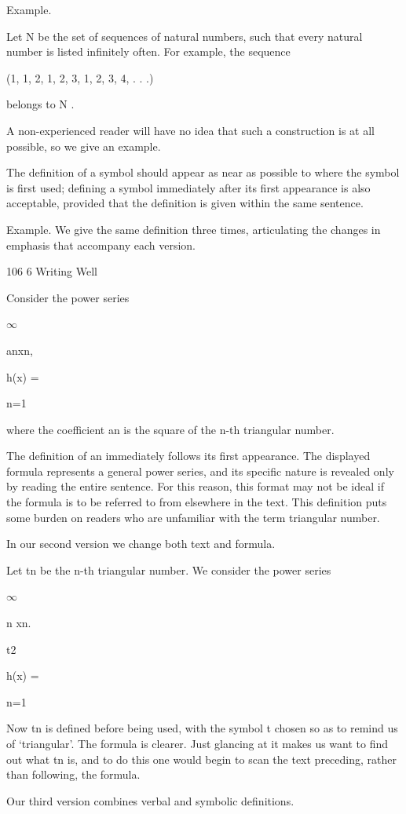 \documentclass[11pt]{article}
\theoremstyle{plain}
\theoremstyle{definition}
\begin{document}
Example.

Let N be the set of sequences of natural numbers, such that every natural number is listed infinitely often. For example, the sequence

(1, 1, 2, 1, 2, 3, 1, 2, 3, 4, . . .)

belongs to N .

A non-experienced reader will have no idea that such a construction is at all possible, so we give an example.

The definition of a symbol should appear as near as possible to where the symbol is first used; defining a symbol immediately after its first appearance is also acceptable, provided that the definition is given within the same sentence.

Example. We give the same definition three times, articulating the changes in emphasis that accompany each version.

106 6 Writing Well

Consider the power series

$\infty$

anxn,

h(x) =

n=1

where the coefficient an is the square of the n-th triangular number.

The definition of an immediately follows its first appearance. The displayed formula represents a general power series, and its specific nature is revealed only by reading the entire sentence. For this reason, this format may not be ideal if the formula is to be referred to from elsewhere in the text. This definition puts some burden on readers who are unfamiliar with the term triangular number.

In our second version we change both text and formula.

Let tn be the n-th triangular number. We consider the power series

$\infty$

n xn.

t2

h(x) =

n=1

Now tn is defined before being used, with the symbol t chosen so as to remind us of `triangular'. The formula is clearer. Just glancing at it makes us want to find out what tn is, and to do this one would begin to scan the text preceding, rather than following, the formula.

Our third version combines verbal and symbolic definitions.
\end{document}
